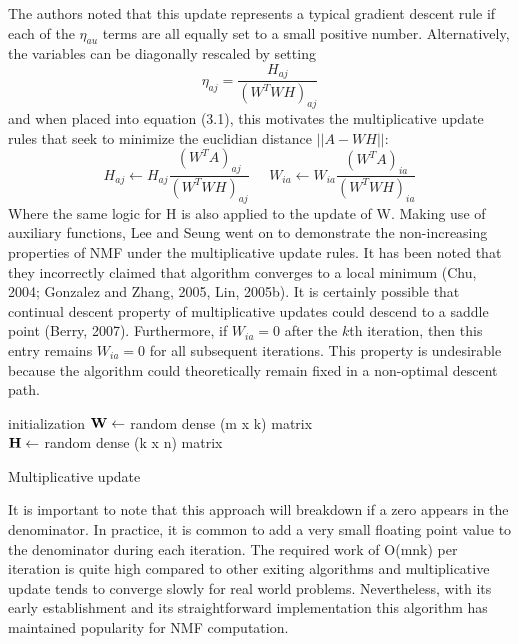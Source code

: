\documentclass[final,leqno,onefignum,onetabnum]{siamltex1213}
\begin{document}
The authors noted that this update represents a typical gradient descent rule if each of the $\eta_{au} $ terms are all equally set to a small positive number. Alternatively, the variables can be diagonally rescaled by setting
\begin{equation}\label{et1}
 \eta_{aj} = \frac{ H_{aj} }{(W^T WH)_{aj}}
\end{equation}
and when placed into equation (3.1), this motivates the multiplicative update rules that seek to minimize the euclidian distance $||A - WH ||$:
\begin{equation}\label{au1}
 H_{aj} \leftarrow  H_{aj} \frac{(W^T A)_{aj} }{ (W^T WH)_{aj} } \; \; \; \; \; W_{ia} \leftarrow  W_{ia} \frac{(W^T A)_{ia} }{ (W^T WH)_{ia} }
\end{equation}
Where the same logic for H is also applied to the update of W. Making use of auxiliary functions, Lee and Seung went on to demonstrate the non-increasing properties of NMF under the multiplicative update rules. It has been noted that they incorrectly claimed that algorithm converges to a local minimum (Chu, 2004; Gonzalez and Zhang, 2005, Lin, 2005b). It is certainly possible that continual descent property of multiplicative updates could descend to a saddle point (Berry, 2007). Furthermore, if $W_{ia} = 0$ after the $k$th iteration, then this entry remains $W_{ia} = 0$ for all subsequent iterations. This property is undesirable because the algorithm could theoretically remain fixed in a non-optimal descent path. \\

\begin{algorithm}[H]

 initialization\;
$\bf{W} \gets $ random dense (m x k) matrix\\
$\bf{H} \gets $ random dense (k x n) matrix\\
 \caption{Multiplicative update}
\end{algorithm} 

It is important to note that this approach will breakdown if a zero appears in the denominator. In practice, it is common to add a very small floating point value to the denominator during each iteration. The required work of O(mnk) per iteration is quite high compared to other exiting algorithms and multiplicative update tends to converge slowly for real world problems. Nevertheless, with its early establishment and its straightforward implementation this algorithm has maintained popularity for NMF computation. 
\end{document}
